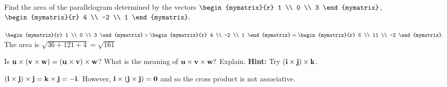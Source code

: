 \begin{enumialphparenastyle}
\begin{ex} Find the area of the parallelogram determined by the vectors
$\begin{mymatrix}{r}
1 \\
0 \\
3
\end{mymatrix} $, $\begin{mymatrix}{r}
4 \\
-2 \\
1
\end{mymatrix} .$
\begin{sol}
$\begin{mymatrix}{r}
1 \\
0 \\
3
\end{mymatrix} \times
\begin{mymatrix}{r}
4 \\
-2 \\
1
\end{mymatrix} =\begin{mymatrix}{r}
6 \\
11 \\
-2
\end{mymatrix} .$ The area is $\sqrt{36+121+4}= \sqrt{161}$
\end{sol}
\end{ex}


\begin{ex} Is ${\bf u}\times \left({\bf v}\times {\bf w}\right) =\left(
{\bf u}\times {\bf v}\right) \times {\bf w}$? What is the meaning of 
${\bf u}\times {\bf v}\times {\bf w}?$ Explain. 
\textbf{Hint: }Try $\left({\bf i}\times {\bf j}
\right)\times {\bf k}$.
\begin{sol}
 $\left({\bf i}\times {\bf j}\right) \times
{\bf j}={\bf k}\times {\bf j}=-{\bf i}.$ However, ${\bf i}\times \left({\bf j}\times {\bf j}
\right) ={\bf 0}$ and so the cross product is not associative.
\end{sol}
\end{ex}


\end{enumialphparenastyle}
